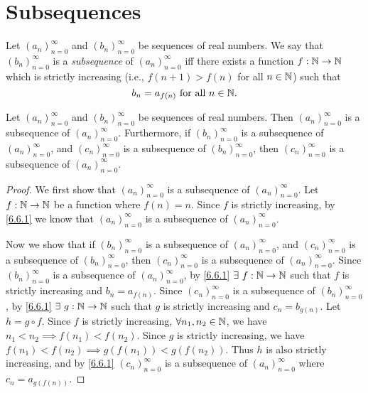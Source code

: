 \section{Subsequences}\label{sec:6.6}

\begin{defn}[Subsequences]\label{6.6.1}
  Let \((a_n)_{n = 0}^\infty\) and \((b_n)_{n = 0}^\infty\) be sequences of real numbers.
  We say that \((b_n)_{n = 0}^\infty\) is a \emph{subsequence} of \((a_n)_{n = 0}^\infty\) iff there exists a function \(f : \mathbb{N} \to \mathbb{N}\) which is strictly increasing (i.e., \(f(n + 1) > f(n)\) for all \(n \in \mathbb{N}\)) such that
  \[
    b_n = a_{f(n)} \text{ for all } n \in \mathbb{N}.
  \]
\end{defn}

\setcounter{thm}{3}
\begin{lem}\label{6.6.4}
  Let \((a_n)_{n = 0}^\infty\) and \((b_n)_{n = 0}^\infty\) be sequences of real numbers.
  Then \((a_n)_{n = 0}^\infty\) is a subsequence of \((a_n)_{n = 0}^\infty\).
  Furthermore, if \((b_n)_{n = 0}^\infty\) is a subsequence of \((a_n)_{n = 0}^\infty\), and \((c_n)_{n = 0}^\infty\) is a subsequence of \((b_n)_{n = 0}^\infty\), then \((c_n)_{n = 0}^\infty\) is a subsequence of \((a_n)_{n = 0}^\infty\).
\end{lem}

\begin{proof}
  We first show that \((a_n)_{n = 0}^\infty\) is a subsequence of \((a_n)_{n = 0}^\infty\).
  Let \(f : \mathbb{N} \to \mathbb{N}\) be a function where \(f(n) = n\).
  Since \(f\) is strictly increasing, by \cref{6.6.1} we know that \((a_n)_{n = 0}^\infty\) is a subsequence of \((a_n)_{n = 0}^\infty\).

  Now we show that if \((b_n)_{n = 0}^\infty\) is a subsequence of \((a_n)_{n = 0}^\infty\), and \((c_n)_{n = 0}^\infty\) is a subsequence of \((b_n)_{n = 0}^\infty\), then \((c_n)_{n = 0}^\infty\) is a subsequence of \((a_n)_{n = 0}^\infty\).
  Since \((b_n)_{n = 0}^\infty\) is a subsequence of \((a_n)_{n = 0}^\infty\), by \cref{6.6.1} \(\exists\ f : \mathbb{N} \to \mathbb{N}\) such that \(f\) is strictly increasing and \(b_n = a_{f(n)}\).
  Since \((c_n)_{n = 0}^\infty\) is a subsequence of \((b_n)_{n = 0}^\infty\), by \cref{6.6.1} \(\exists\ g : \mathbb{N} \to \mathbb{N}\) such that \(g\) is strictly increasing and \(c_n = b_{g(n)}\).
  Let \(h = g \circ f\).
  Since \(f\) is strictly increasing, \(\forall n_1, n_2 \in \mathbb{N}\), we have \(n_1 < n_2 \implies f(n_1) < f(n_2)\).
  Since \(g\) is strictly increasing, we have \(f(n_1) < f(n_2) \implies g(f(n_1)) < g(f(n_2))\).
  Thus \(h\) is also strictly increasing, and by \cref{6.6.1} \((c_n)_{n = 0}^\infty\) is a subsequence of \((a_n)_{n = 0}^\infty\) where \(c_n = a_{g(f(n))}\).
\end{proof}

